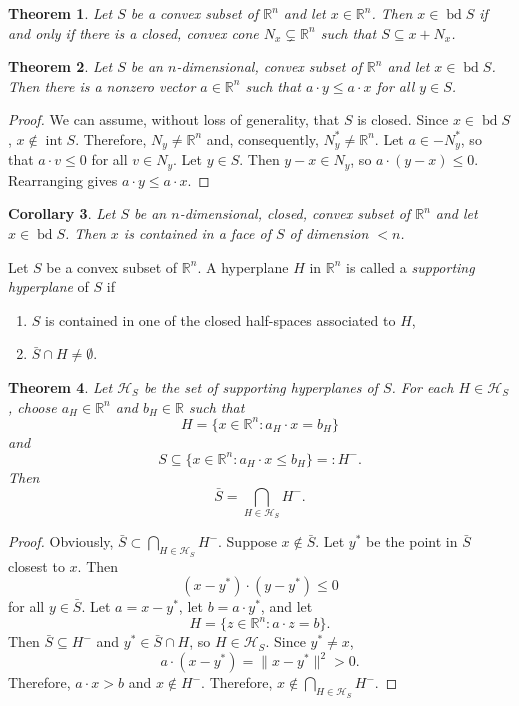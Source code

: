 \documentclass[12pt]{amsart}
\newtheorem{theorem}{Theorem}[section]
\newtheorem{corollary}[theorem]{Corollary}
\theoremstyle{definition}
\theoremstyle{remark}
\numberwithin{equation}{section}
\newcommand{\RR}{\mathbb{R}}
\DeclareMathOperator{\interior}{int}
\DeclareMathOperator{\bd}{bd}
\begin{document}
\begin{theorem}
    Let $S$ be a convex subset of $\RR^n$ and let $x\in\RR^n$.
    Then $x\in\bd S$ if and only if there is a closed, convex cone
    $N_x\subsetneq \RR^n$ such that $S\subseteq x + N_x$.
\end{theorem}

\begin{theorem}
    Let $S$ be an $n$-dimensional, convex subset of $\RR^n$ and let
    $x\in\bd S$.
    Then there is a nonzero vector $a\in\RR^n$ such that
    $a\cdot y\leq a\cdot x$ for all $y\in S$.
\end{theorem}

\begin{proof}
    We can assume, without loss of generality, that $S$ is closed.
    Since $x\in\bd S$, $x\notin\interior S$.
    Therefore, $N_y\neq \RR^n$ and, consequently, $N_y^*\neq \RR^n$.
    Let $a\in-N_y^*$, so that
    $a\cdot v\leq 0$ for all $v\in N_y$.
    Let $y\in S$.
    Then $y-x\in N_y$, so $a\cdot(y-x)\leq 0$.
    Rearranging gives $a\cdot y \leq a\cdot x$.
\end{proof}

\begin{corollary}
    Let $S$ be an $n$-dimensional, closed, convex subset of $\RR^n$ and let
    $x\in\bd S$.
    Then $x$ is contained in a face of $S$ of dimension $< n$.
\end{corollary}

Let $S$ be a convex subset of $\RR^n$.
A hyperplane $H$ in $\RR^n$ is called a \emph{supporting hyperplane}
of $S$ if
\begin{enumerate}
    \item $S$ is contained in one of the closed half-spaces associated to $H$,
    \item $\bar S\cap H\neq\emptyset$.
\end{enumerate}

\begin{theorem}
    Let $\mathcal{H}_S$ be the set of supporting hyperplanes of $S$.
    For each $H\in\mathcal{H}_S$, choose $a_H\in\RR^n$ and $b_H\in\RR$ such that
    \[
        H = \{x\in\RR^n : a_H\cdot x = b_H\}
    \]
    and
    \[
        S\subseteq \{x\in \RR^n : a_H\cdot x\leq b_H\}=: H^-.
    \]
    Then
    \[
        \bar{S}=\bigcap_{H\in\mathcal{H}_S}H^-.
    \]    
\end{theorem}

\begin{proof}
    Obviously, $\bar S\subset \bigcap_{H\in\mathcal{H}_S}H^-$.
    Suppose $x\notin \bar S$.
    Let $y^*$ be the point in $\bar S$ closest to $x$.
    Then
    \[
        (x-y^*)\cdot(y-y^*)\leq 0
    \]
    for all $y\in\bar S$.
    Let $a=x-y^*$, let $b=a\cdot y^*$, and let
    \[
        H = \{z\in\RR^n : a\cdot z= b\}.
    \]
    Then $\bar S\subseteq H^-$ and $y^*\in \bar S\cap H$, so $H\in \mathcal{H}_S$.
    Since $y^*\neq x$,
    \[
        a\cdot (x-y^*) = \|x-y^*\|^2 > 0.
    \]
    Therefore, $a\cdot x > b$ and $x\notin H^-$. Therefore,
    $x\notin\bigcap_{H\in\mathcal{H}_S}H^-$.
\end{proof}
\end{document}
